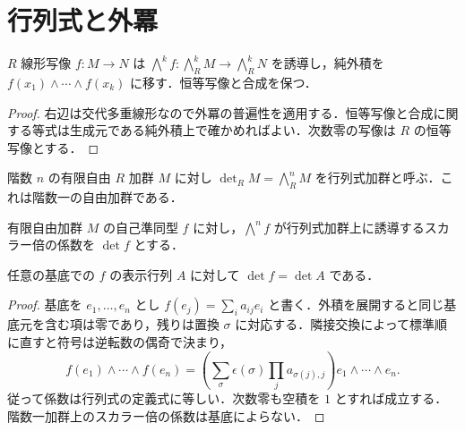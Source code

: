 \section{行列式と外冪}
\begin{prop}[外冪の函手性]
$R$ 線形写像 $f:M\to N$ は $\bigwedge^k f:\bigwedge_R^k M\to\bigwedge_R^k N$ を誘導し，純外積を $f(x_1)\wedge\cdots\wedge f(x_k)$ に移す．恒等写像と合成を保つ．
\end{prop}
\begin{proof}
右辺は交代多重線形なので外冪の普遍性を適用する．恒等写像と合成に関する等式は生成元である純外積上で確かめればよい．次数零の写像は $R$ の恒等写像とする．
\end{proof}
\begin{defn}[行列式加群]
階数 $n$ の有限自由 $R$ 加群 $M$ に対し $\det_R M=\bigwedge_R^n M$ を行列式加群と呼ぶ．これは階数一の自由加群である．
\end{defn}
\begin{defn}[内在的行列式]
有限自由加群 $M$ の自己準同型 $f$ に対し，$\bigwedge^n f$ が行列式加群上に誘導するスカラー倍の係数を $\det f$ とする．
\end{defn}
\begin{prop}[表示行列の行列式との一致]
任意の基底での $f$ の表示行列 $A$ に対して $\det f=\det A$ である．
\end{prop}
\begin{proof}
基底を $e_1,\ldots,e_n$ とし $f(e_j)=\sum_i a_{ij}e_i$ と書く．外積を展開すると同じ基底元を含む項は零であり，残りは置換 $\sigma$ に対応する．隣接交換によって標準順に直すと符号は逆転数の偶奇で決まり，
\[
 f(e_1)\wedge\cdots\wedge f(e_n)=
 \left(\sum_\sigma\epsilon(\sigma)\prod_j a_{\sigma(j),j}\right)e_1\wedge\cdots\wedge e_n .
\]
従って係数は行列式の定義式に等しい．次数零も空積を $1$ とすれば成立する．階数一加群上のスカラー倍の係数は基底によらない．
\end{proof}
